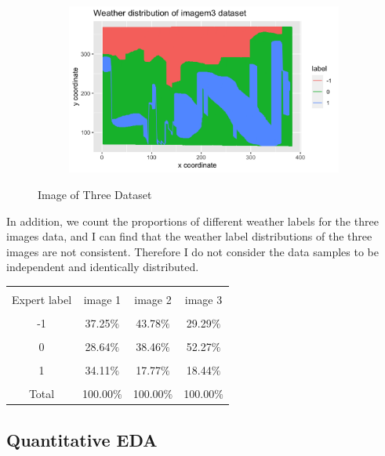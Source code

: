 \documentclass[11pt]{article}
\begin{document}
\begin{figure}[H]
  \begin{subfigure}{.5\textwidth}
    \centering
      \includegraphics[width=1\textwidth, height=0.6\textwidth]{../figures/figure3.png}
  \end{subfigure}
  \caption{Image of Three Dataset}
\end{figure}

\bigskip

In addition, we count the proportions of different weather labels for the three images data, and I can find that the weather label distributions of the three images are not consistent. Therefore I do not consider the data samples to be independent and identically distributed.
\begin{table}[htbp]
\centering
	\begin{tabular}{|c|c|c|c|}  
		\hline  
		& & & \\[-8pt]  
		Expert label&image 1&image 2&image 3 \\ 
		\hline
		& & & \\[-8pt] 
		-1&37.25$\%$&43.78$\%$&29.29$\%$ \\
		\hline
		& & & \\[-8pt] 
		0&28.64$\%$&38.46$\%$&52.27$\%$ \\
		\hline
		& & & \\[-8pt] 
		1&34.11$\%$&17.77$\%$&18.44$\%$ \\
		\hline
		& & & \\[-8pt] 
		Total&100.00$\%$&100.00$\%$&100.00$\%$ \\
		\hline
	\end{tabular}
\end{table}

\subsection{Quantitative EDA}
\end{document}
